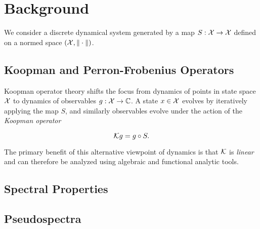 
\section{Background}

We consider a discrete dynamical system generated by a map $S : \mathcal{X} \to \mathcal{X}$ defined 
on a normed space $( \mathcal{X}, \| \cdot \| )$. 

\subsection{Koopman and Perron-Frobenius Operators}

Koopman operator theory shifts the focus from dynamics of points in state space $\mathcal{X}$ to 
dynamics of observables $g : \mathcal{X} \to \mathbb{C}$. A state $x \in \mathcal{X}$ evolves by iteratively 
applying the map $S$, and similarly observables evolve under the action of the 
\emph{Koopman operator}

\begin{equation}
    \mathcal{K} g = g \circ S . 
\end{equation}

The primary benefit of this alternative viewpoint of dynamics is that $\mathcal{K}$ is 
\emph{linear} and can therefore be analyzed using algebraic and functional analytic tools. 


\subsection{Spectral Properties}

\subsection{Pseudospectra}

